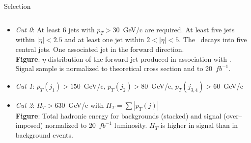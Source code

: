 \begin{frame}{Selection}
\vspace{-.2cm}

\begin{columns}
\begin{column}{.50\textwidth}
\begin{block}{}
\begin{itemize}\scriptsize
\item \textit{Cut 0}: At least 6 jets with ${p_T > 30}$~GeV/c are required. At least five jets within $|\eta|<2.5$ and at least one jet within $2<|\eta|<5$. The \Tp~decays into five central jets. One associated jet in the forward direction. \\
\textbf{Figure}: $\eta$ distribution of the forward jet produced in association with \Tp. Signal sample is normalized to theoretical cross section and to 20~$fb^{-1}$.
\item \textit{Cut 1}: ${p_{T}(j_{1})>150}$~GeV/c, ${p_{T}(j_{2})>80}$~GeV/c, ${p_{T}(j_{3,4})>60}$~GeV/c
\item \textit{Cut 2}: $H_{T}>630$~GeV/c with $H_{T}=\sum |p_{T}(j)|$\\
\textbf{Figure}: Total hadronic energy for backgrounds (stacked) and signal (over--imposed) normalized to 20~$fb^{-1}$ luminosity. $H_{T}$ is higher in signal than in background events.
\end{itemize}
\end{block}
\end{column}


\end{columns}
\end{frame}
